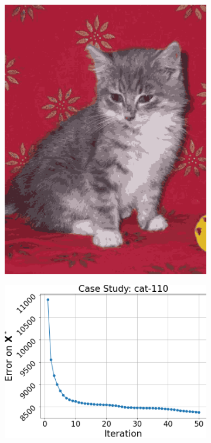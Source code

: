 \begin{figure}[htbp]
\begin{subfigure}[t]{0.32\textwidth}
        \includegraphics[width=\linewidth]{../../python_code/plots/kmeans/cat-110/reconstruction.png}
    \end{subfigure}
    \begin{subfigure}[t]{0.32\textwidth}
        \includegraphics[width=\linewidth]{../../python_code/plots/kmeans/cat-110/elbow_curve.png}

\end{subfigure}
\end{figure}

